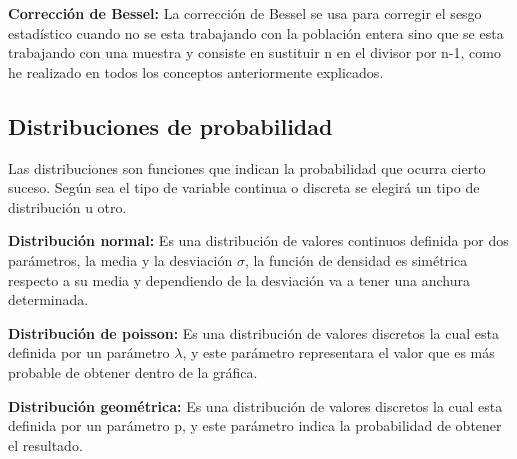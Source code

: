 \textbf{Corrección de Bessel:} La corrección de Bessel se usa para corregir el sesgo estadístico cuando no se esta trabajando con la población entera sino que se esta trabajando con una muestra y consiste en sustituir n en el divisor por n-1, como he realizado en todos los conceptos anteriormente explicados\cite{bessel}.


\subsection{Distribuciones de probabilidad}

Las distribuciones son funciones que indican la probabilidad que ocurra cierto suceso. Según sea el tipo de variable continua o discreta se elegirá un tipo de distribución u otro.

\textbf{Distribución normal:} Es una distribución de valores continuos definida por dos parámetros, la media {\textmu} y la desviación $\sigma$, la función de densidad es simétrica respecto a su media y dependiendo de la desviación va a tener una anchura determinada\cite{distribuciones}.


\textbf{Distribución de poisson:} Es una distribución de valores discretos la cual esta definida por un parámetro $\lambda$, y este parámetro representara el valor que es más probable de obtener dentro de la gráfica.


\textbf{Distribución geométrica:} Es una distribución de valores discretos la cual esta definida por un parámetro p, y este parámetro indica la probabilidad de obtener el resultado.

